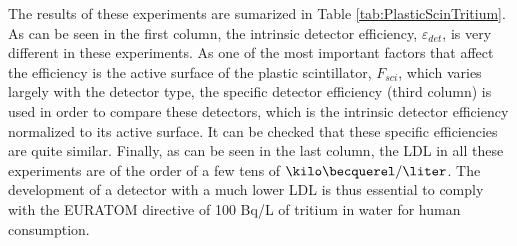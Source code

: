 The results of these experiments are sumarized in Table \ref{tab:PlasticScinTritium}. As can be seen in the first column, the intrinsic detector efficiency, $\varepsilon_{det}$, is very different in these experiments. As one of the most important factors that affect the efficiency is the active surface of the plastic scintillator, $F_{sci}$, which varies largely with the detector type, the specific detector efficiency (third column) is used in order to compare these detectors, which is the intrinsic detector efficiency normalized to its active surface. It can be checked that these specific efficiencies are quite similar. Finally, as can be seen in the last column, the LDL in all these experiments are of the order of a few tens of $\kilo\becquerel/\liter$. The development of a detector with a much lower LDL is thus essential to comply with the EURATOM directive of 100 Bq/L of tritium in water for human consumption.